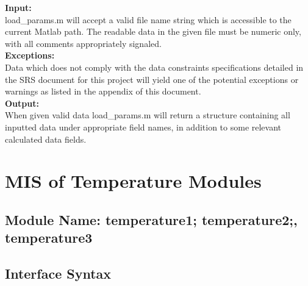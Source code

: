 \documentclass[12pt]{article}
\begin{document}
\noindent \textbf{Input:}\\
load\_{params.m} will accept a valid file name string which is accessible to the current Matlab path.
The readable data in the given file must be numeric only, with all comments 
appropriately signaled.\\

\noindent \textbf{Exceptions:}\\
Data which does not comply with the data constraints specifications detailed in
the SRS document for this project will yield one of the potential exceptions or
warnings as listed in the appendix of this document.\\  

\noindent \textbf{Output:}\\
When given valid data load\_{params.m} will return a structure containing all
inputted data under appropriate field names, in addition to some relevant 
calculated data fields.


\section{MIS of Temperature Modules}

\subsection{Module Name: temperature1; temperature2;, temperature3}





\subsection{Interface Syntax}
\end{document}
